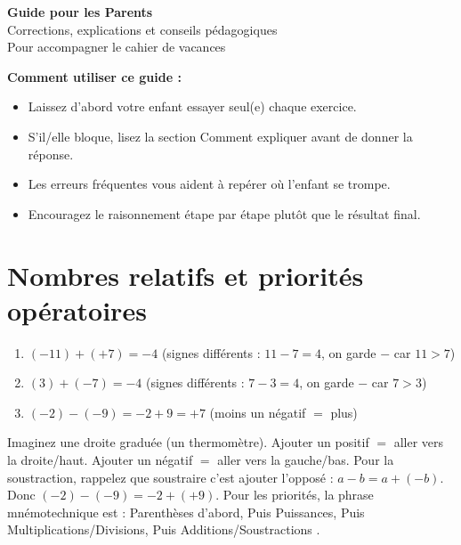 \documentclass[11pt,a4paper]{article}
\newcommand{\corrbox}[1]{
\begin{tcolorbox}[colback=correctgreen!8!white,colframe=correctgreen!60!black]
#1
\end{tcolorbox}
}
\newcommand{\tipbox}[1]{
\begin{tcolorbox}[colback=tipblue!8!white,colframe=tipblue!60!black,title=\textbf{Comment expliquer}]
#1
\end{tcolorbox}
}
\begin{document}
\begin{center}
{\LARGE \textbf{Guide pour les Parents}}\\[0.3cm]
{\large Corrections, explications et conseils p\'edagogiques}\\[0.2cm]
{\normalsize Pour accompagner le cahier de vacances}
\end{center}

\vspace{0.5cm}

\textbf{Comment utiliser ce guide :}
\begin{itemize}
\item Laissez d'abord votre enfant essayer seul(e) chaque exercice.
\item S'il/elle bloque, lisez la section \guillemotleft{} Comment expliquer \guillemotright{} avant de donner la r\'eponse.
\item Les erreurs fr\'equentes vous aident \`a rep\'erer o\`u l'enfant se trompe.
\item Encouragez le raisonnement \'etape par \'etape plut\^ot que le r\'esultat final.
\end{itemize}

\section{Nombres relatifs et priorit\'es op\'eratoires}

\corrbox{
\begin{enumerate}
\item $(-11) + (+7) = -4$ \quad (signes diff\'erents : $11 - 7 = 4$, on garde $-$ car $11 > 7$)
\item $(3) + (-7) = -4$ \quad (signes diff\'erents : $7 - 3 = 4$, on garde $-$ car $7 > 3$)
\item $(-2) - (-9) = -2 + 9 = +7$ \quad (moins un n\'egatif $=$ plus)
\end{enumerate}
}

\tipbox{
Imaginez une droite gradu\'ee (un thermom\`etre). Ajouter un positif $=$ aller vers la droite/haut. Ajouter un n\'egatif $=$ aller vers la gauche/bas. Pour la soustraction, rappelez que soustraire c'est ajouter l'oppos\'e : $a - b = a + (-b)$. Donc $(-2) - (-9) = -2 + (+9)$. Pour les priorit\'es, la phrase mn\'emotechnique est : \guillemotleft{} Parenth\`eses d'abord, Puis Puissances, Puis Multiplications/Divisions, Puis Additions/Soustractions \guillemotright{}.
}
\end{document}
